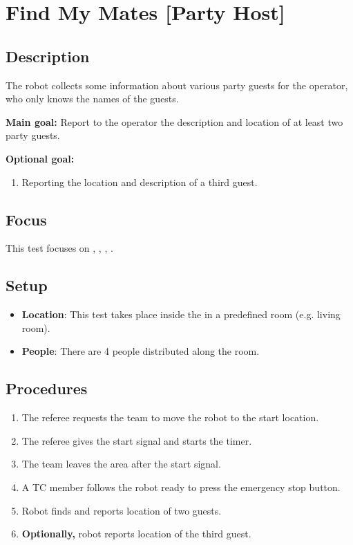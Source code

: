 \section{Find My Mates [Party Host]}
\label{test:find-my-mates}

\subsection*{Description}
    The robot collects some information about various party guests for the operator, who only knows the names of the guests.

\textbf{Main goal:}
    Report to the operator the description and location of at least two party guests.

\textbf{Optional goal:}
\begin{enumerate}[nosep]
	\item Reporting the location and description of a third guest.
\end{enumerate}

\subsection*{Focus}
This test focuses on \SysI{}, \HRI{}, \PerDet{}, \PerRec. 

\subsection*{Setup}
\begin{itemize}
	\item \textbf{Location}: This test takes place inside the \Arena{} in a predefined room (e.g. living room).
	\item \textbf{People}: There are 4 people distributed along the room.
\end{itemize}

\subsection*{Procedures}
\begin{enumerate}
	\item The referee requests the team to move the robot to the start location.
	\item The referee gives the start signal and starts the timer.
	\item The team leaves the area after the start signal.
	\item A TC member follows the robot ready to press the emergency stop button. 
	\item Robot finds and reports location of two guests.
	\item \textbf{Optionally,} robot reports location of the third guest.
\end{enumerate}

